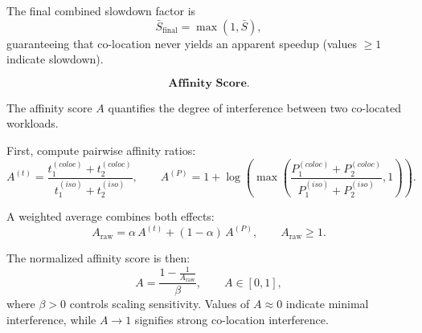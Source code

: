The final combined slowdown factor is
\[
    \bar{S}_{\text{final}} = \max(1, \bar{S}),
\]
guaranteeing that co-location never yields an apparent
speedup (values \(\ge 1\) indicate slowdown).

\[
    \textbf{Affinity Score.}
\]

The affinity score \(A\) quantifies the degree of
interference between two co-located workloads.

First, compute pairwise affinity ratios:
\[
    A^{(t)} =
    \frac{t_1^{(coloc)} + t_2^{(coloc)}}
    {t_1^{(iso)} + t_2^{(iso)}},
    \qquad
    A^{(P)} =
    1 + \log\!\left(
    \max\!\left(
    \frac{P_1^{(coloc)} + P_2^{(coloc)}}
    {P_1^{(iso)} + P_2^{(iso)}},
    1
    \right)
    \right).
\]

A weighted average combines both effects:
\[
    A_{\text{raw}} =
    \alpha\, A^{(t)} + (1 - \alpha)\, A^{(P)},
    \qquad A_{\text{raw}} \ge 1.
\]

The normalized affinity score is then:
\[
    A =
    \frac{1 - \frac{1}{A_{\text{raw}}}}{\beta},
    \qquad A \in [0, 1],
\]
where \(\beta > 0\) controls scaling sensitivity.
Values of $A \approx 0$ indicate minimal interference,
while \(A \to 1\) signifies strong co-location interference.


